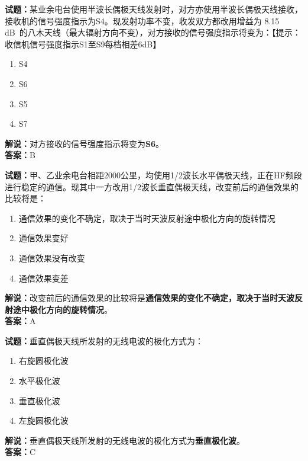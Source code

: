 \documentclass{ctexbook}
\begin{document}
\vspace{1em}

\textbf{试题：}某业余电台使用半波长偶极天线发射时，对方亦使用半波长偶极天线接收，接收机的信号强度指示为S4。现发射功率不变，收发双方都改用增益为 8.15 \unit[qualifier-mode=combine]{\deci\bel{}}的八木天线（最大辐射方向不变），对方接收的信号强度指示将变为：【提示：收信机信号强度指示S1至S9每档相差6dB】
\begin{enumerate}[leftmargin=3em]
  \item S4
  \item S6
  \item S5
  \item S7
\end{enumerate}
\noindent\textbf{解说：}对方接收的信号强度指示将变为\textbf{S6}。\\\noindent\textbf{答案：}B

\vspace{1em}

\textbf{试题：}甲、乙业余电台相距2000公里，均使用1/2波长水平偶极天线，正在HF频段进行稳定的通信。现其中一方改用1/2波长垂直偶极天线，改变前后的通信效果的比较将是：
\begin{enumerate}[leftmargin=3em]
  \item 通信效果的变化不确定，取决于当时天波反射途中极化方向的旋转情况
  \item 通信效果变好
  \item 通信效果没有改变
  \item 通信效果变差
\end{enumerate}
\noindent\textbf{解说：}改变前后的通信效果的比较将是\textbf{通信效果的变化不确定，取决于当时天波反射途中极化方向的旋转情况}。\\\noindent\textbf{答案：}A

\vspace{1em}

\textbf{试题：}垂直偶极天线所发射的无线电波的极化方式为：
\begin{enumerate}[leftmargin=3em]
  \item 右旋圆极化波
  \item 水平极化波
  \item 垂直极化波
  \item 左旋圆极化波
\end{enumerate}
\noindent\textbf{解说：}垂直偶极天线所发射的无线电波的极化方式为\textbf{垂直极化波}。\\\noindent\textbf{答案：}C

\vspace{1em}
\end{document}
